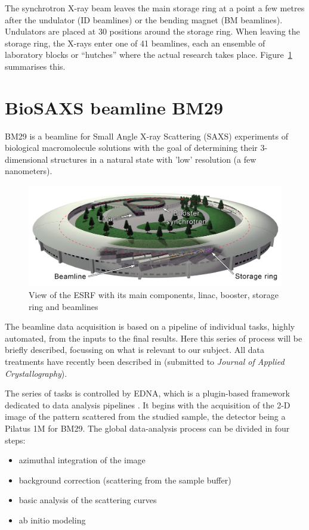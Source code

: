 \documentclass[a4paper, 11pt]{report}
\begin{document}
The synchrotron X-ray beam leaves the main storage ring at a point a 
few metres after the undulator (ID beamlines) or the bending magnet 
(BM beamlines). 
Undulators are placed at 30 positions around the storage ring.
When leaving the storage ring, the X-rays enter one of 41 beamlines, 
each an ensemble of laboratory blocks or “hutches” where the actual 
research takes place. 
Figure~\ref{fgr:synchrotron} summarises this.

\section{BioSAXS beamline BM29}
\label{bm29}
BM29 \cite{BM29paper} is a beamline for Small Angle X-ray Scattering 
(SAXS) experiments of biological macromolecule solutions with the goal 
of determining their 3-dimensional structures in a natural state with 
'low' resolution (a few nanometers). 

\begin{figure}
\centering
\includegraphics[scale=0.22]{synchrotron.png}
\caption{View of the ESRF with its main components, linac, booster, 
    storage ring and beamlines}
\label{fgr:synchrotron}
\end{figure}

The beamline data acquisition is based on a pipeline of individual 
tasks, highly automated, from the inputs to the final results. 
Here this series of process will be briefly described, focussing on 
what is relevant to our subject.
All data treatments have recently been described in \cite{BM29news} 
(submitted to \textit{Journal of Applied Crystallography}).

The series of tasks is controlled by EDNA, which is a plugin-based 
framework dedicated to data analysis pipelines \cite{edna}. 
It begins with the acquisition of the 2-D image of the pattern 
scattered from the studied sample, the detector being a Pilatus 1M for 
BM29. 
The global data-analysis process can be divided in four steps: 
\begin{itemize}
 \item azimuthal integration of the image
 \item background correction (scattering from the sample buffer)
 \item basic analysis of the scattering curves
 \item ab initio modeling
\end{itemize}
\end{document}
